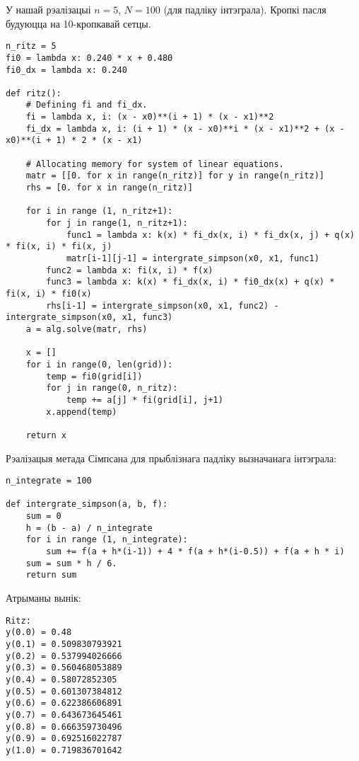 У нашай рэалізацыі $n=5$, $N=100$ (для падліку інтэграла). Кропкі пасля будуюцца на 10-кропкавай сетцы.
{\small
\begin{verbatim}
n_ritz = 5
fi0 = lambda x: 0.240 * x + 0.480
fi0_dx = lambda x: 0.240

def ritz():
    # Defining fi and fi_dx.
    fi = lambda x, i: (x - x0)**(i + 1) * (x - x1)**2
    fi_dx = lambda x, i: (i + 1) * (x - x0)**i * (x - x1)**2 + (x - x0)**(i + 1) * 2 * (x - x1)

    # Allocating memory for system of linear equations.
    matr = [[0. for x in range(n_ritz)] for y in range(n_ritz)]
    rhs = [0. for x in range(n_ritz)]

    for i in range (1, n_ritz+1):
        for j in range(1, n_ritz+1):
            func1 = lambda x: k(x) * fi_dx(x, i) * fi_dx(x, j) + q(x) * fi(x, i) * fi(x, j)
            matr[i-1][j-1] = intergrate_simpson(x0, x1, func1)
        func2 = lambda x: fi(x, i) * f(x)
        func3 = lambda x: k(x) * fi_dx(x, i) * fi0_dx(x) + q(x) * fi(x, i) * fi0(x)
        rhs[i-1] = intergrate_simpson(x0, x1, func2) - intergrate_simpson(x0, x1, func3)
    a = alg.solve(matr, rhs)

    x = []
    for i in range(0, len(grid)):
        temp = fi0(grid[i])
        for j in range(0, n_ritz):
            temp += a[j] * fi(grid[i], j+1)
        x.append(temp)

    return x
\end{verbatim}
}

Рэалізацыя метада Сімпсана для прыблізнага падліку вызначанага інтэграла:
{\small
\begin{verbatim}
n_integrate = 100

def intergrate_simpson(a, b, f):
    sum = 0
    h = (b - a) / n_integrate
    for i in range (1, n_integrate):
        sum += f(a + h*(i-1)) + 4 * f(a + h*(i-0.5)) + f(a + h * i)
    sum = sum * h / 6.
    return sum
\end{verbatim}
}

Атрыманы вынік:
{\small
\begin{verbatim}
Ritz:
y(0.0) = 0.48
y(0.1) = 0.509830793921
y(0.2) = 0.537994026666
y(0.3) = 0.560468053889
y(0.4) = 0.58072852305
y(0.5) = 0.601307384812
y(0.6) = 0.622386606891
y(0.7) = 0.643673645461
y(0.8) = 0.666359730496
y(0.9) = 0.692516022787
y(1.0) = 0.719836701642
\end{verbatim}
}
